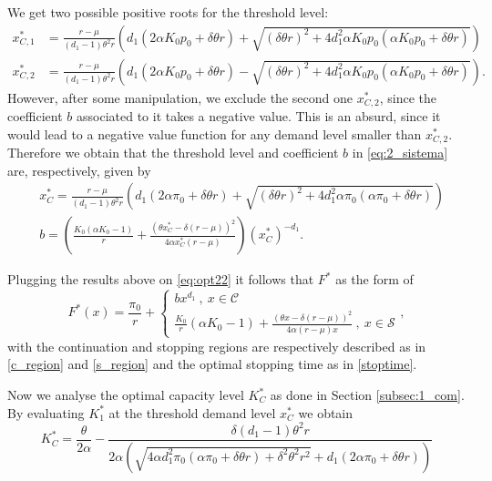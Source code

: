 We get two possible positive roots for the threshold level:
\begin{align*}
x^*_{C,1}&=\frac{r-\mu}{(d_1-1) \theta ^2 r}
\left(
d_1 \left(2 \alpha K_0 p_0 + \delta  \theta  r \right) +
\sqrt{(\delta  \theta  r)^2 + 4 d_1^2 \alpha K_0 p_0 \left( \alpha K_0 p_0 +\delta  \theta  r \right)} \right)\\
x^*_{C,2}&=\frac{r-\mu}{(d_1-1) \theta ^2 r}
\left(
d_1 \left(2 \alpha K_0 p_0 + \delta  \theta  r \right) -
\sqrt{(\delta  \theta  r)^2 + 4 d_1^2 \alpha K_0 p_0 \left( \alpha K_0 p_0 +\delta  \theta  r \right)} \right).
\end{align*}
However, after some manipulation, we exclude the second one $x^*_{C,2}$, since the coefficient $b$ associated to it takes a negative value. This is an absurd, since it would lead to a negative value function for any demand level smaller than $x^*_{C,2}$. Therefore we obtain that the threshold level and coefficient $b$ in \eqref{eq:2_sistema} are, respectively, given by
\begin{align}
&x_C^*=\frac{r-\mu}{(d_1-1) \theta ^2 r}
\left(
d_1 \left(2 \alpha \pi_0 + \delta  \theta  r \right) +
\sqrt{(\delta  \theta  r)^2 + 4 d_1^2 \alpha \pi_0 \left( \alpha \pi_0 +\delta  \theta  r \right)} \right) \label{eq:prob2_xC}\\
&b=\left( \frac{K_0 (\alpha  K_0-1)}{r}+\frac{(\theta  x^*_C-\delta  (r-\mu ))^2}{4 \alpha  x^*_C (r-\mu )} \right)(x_C^*)^{-d_1}. \nonumber
\end{align}

Plugging the results above on \eqref{eq:opt22} it follows that $F^*$ as the form of
\begin{equation}
F^*(x)=\frac{\pi_0}{r}+\begin{cases} b x^{d_1}  \ , \ x \in \mathcal{C} \\
\frac{K_0}{r}(\alpha K_0-1) + \frac{(\theta x -\delta (r-\mu))^2}{4 \alpha (r-\mu) x} \ , \ x \in \mathcal{S}
\end{cases},
\label{2_V*2}
\end{equation}
with the continuation and stopping regions are respectively described as in \eqref{c_region} and \eqref{s_region} and the optimal stopping time as in \eqref{stoptime}.

Now we analyse the optimal capacity level $K^*_C$ as done in Section \ref{subsec:1_com}. By evaluating $K^*_1$ at the threshold demand level $x_C^*$ we obtain
\begin{equation}
K^*_C=\frac{\theta }{2 \alpha }-\frac{\delta  (d_1-1) \theta ^2 r}{2 \alpha  \left(\sqrt{4 \alpha  d_1^2 \pi_0 (\alpha  \pi_0+\delta  \theta  r)+\delta ^2 \theta ^2 r^2}+d_1 (2 \alpha  \pi_0+\delta  \theta  r)\right)}
\label{3_K*}
\end{equation}












